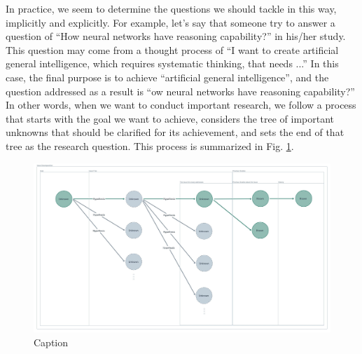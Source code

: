 \documentclass{book}
\begin{document}
In practice, we seem to determine the questions we should tackle in this way, implicitly and explicitly. For example, let's say that someone try to answer a question of ``How neural networks have reasoning capability?'' in his/her study. This question may come from a thought process of ``I want to create artificial general intelligence, which requires systematic thinking, that needs ...'' In this case, the final purpose is to achieve ``artificial general intelligence'', and the question addressed as a result is ``ow neural networks have reasoning capability?'' In other words, when we want to conduct important research, we follow a process that starts with the goal we want to achieve, considers the tree of important unknowns that should be clarified for its achievement, and sets the end of that tree as the research question. This process is summarized in Fig. \ref{fig:unknown_tree}.

\begin{figure}[htb]
    \centering
    \includegraphics[width=\textwidth]{figs/unknown_tree.jpeg}
    \caption{Caption}
    \label{fig:unknown_tree}
\end{figure}

\end{document}
